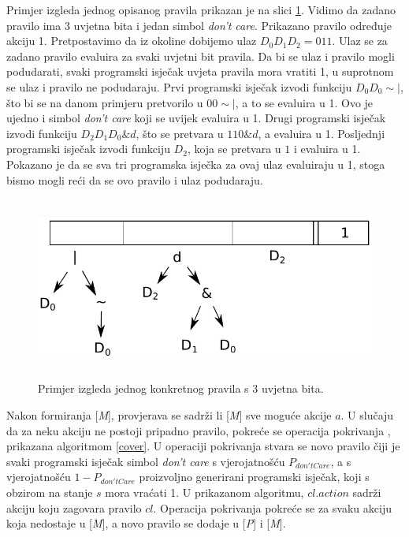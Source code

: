 \documentclass[times, utf8, zavrsni]{fer}
\begin{document}
Primjer izgleda jednog opisanog pravila prikazan je na slici \ref{img:clex}.
Vidimo da zadano pravilo ima 3 uvjetna bita i jedan simbol \emph{don't care}.
Prikazano pravilo određuje akciju 1.
Pretpostavimo da iz okoline dobijemo ulaz $D_{0}D_{1}D_{2} = 011$.
Ulaz se za zadano pravilo evaluira za svaki uvjetni bit pravila.
Da bi se ulaz i pravilo mogli podudarati, svaki programski isječak uvjeta pravila mora vratiti 1, u suprotnom se ulaz i pravilo ne podudaraju.
Prvi programski isječak izvodi funkciju $D_{0}D_{0}\sim|$, što bi se na danom primjeru pretvorilo u $00\sim|$, a to se evaluira u 1.
Ovo je ujedno i simbol \emph{don't care} koji se uvijek evaluira u 1.
Drugi programski isječak izvodi funkciju $D_{2}D_{1}D_{0}\&d$, što se pretvara u $110\&d$, a evaluira u 1.
Posljednji programski isječak izvodi funkciju $D_{2}$, koja se pretvara u $1$ i evaluira u 1.
Pokazano je da se sva tri programska isječka za ovaj ulaz evaluiraju u 1, stoga bismo mogli reći da se ovo pravilo i ulaz podudaraju.
\begin{figure}[h]
    \centering
    \includegraphics[height=6cm]{img/clex.pdf}
    \caption{Primjer izgleda jednog konkretnog pravila s 3 uvjetna bita.}
    \label{img:clex}
\end{figure}

Nakon formiranja [\emph{M}], provjerava se sadrži li [\emph{M}] sve moguće akcije $a$.
U slučaju da za neku akciju ne postoji pripadno pravilo, pokreće se operacija pokrivanja , prikazana algoritmom \ref{cover}.
U operaciji pokrivanja stvara se novo pravilo čiji je svaki programski isječak simbol \emph{don't care} s vjerojatnošću $P_{don'tCare}$, a s vjerojatnošću $1 - P_{don'tCare}$ proizvoljno generirani programski isječak, koji s obzirom na stanje $s$ mora vraćati 1.
U prikazanom algoritmu, $cl.action$ sadrži akciju koju zagovara pravilo $cl$.
Operacija pokrivanja pokreće se za svaku akciju koja nedostaje u [\emph{M}], a novo pravilo se dodaje u [\emph{P}] i [\emph{M}].
\end{document}
